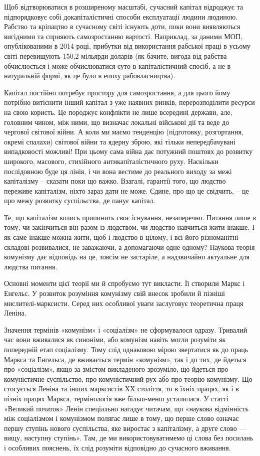 \documentclass[12pt,a4paper,openany]{book}
\begin{document}
Щоб відтворюватися в розширеному масштабі, сучасний капітал відроджує та підпорядковує собі докапіталістичні способи експлуатації людини людиною. Рабство та кріпацтво в сучасному світі існують доти, поки вони виявляються вигідними та сприяють самозростанню вартості. Наприклад, за даними МОП, опублікованими в 2014 році, прибутки від використання рабської праці в усьому світі перевищують 150,2 мільярди доларів (як бачите, вигода від рабства обчислюється і може обчислюватися суто в капіталістичний спосіб, а не в натуральній формі, як це було в епоху рабовласництва).

Капітал постійно потребує простору для самозростання, а для цього йому потрібно витіснити інший капітал з уже наявних ринків, перерозподілити ресурси на свою користь. Це породжує конфлікти не лише всередині держави, але, головним чином, між ними, що визначає локальні військові дії та веде до чергової світової війни. А коли ми маємо тенденцію (підготовку, розгортання, окремі спалахи) світової війни та ядерну зброю, які тільки непередбачувані випадковості можливі! При цьому сама війна дає потужний поштовх до розвитку широкого, масового, стихійного антикапіталістичного руху. Наскільки послідовною буде ця лінія, і чи вона вестиме до реального виходу за межі капіталізму – сказати поки що важко. Взагалі, гарантії того, що людство переживе капіталізм, ніхто зараз дати не може. Єдине, про що це свідчить, – це про межу розвитку суспільства, де панує капітал.

Те, що капіталізм колись припинить своє існування, незаперечно. Питання лише в тому, чи закінчиться він разом із людством, чи людство навчиться жити інакше. І як саме інакше можна жити, щоб і людство в цілому, і всі його різноманітні складові розвивалися, не заважаючи, а допомагаючи одне одному? Наукова теорія комунізму дає відповідь на це, зовсім не застаріле, а надзвичайно актуальне для людства питання.

Основні моменти цієї теорії ми й спробуємо тут викласти. Її створили Маркс і Енгельс. У розвиток розуміння комунізму свій внесок зробили й пізніші мислителі-марксисти. Серед них особливої уваги заслуговує теоретична праця Леніна.

Значення термінів «комунізм» і «соціалізм» не сформувалося одразу. Тривалий час вони вживалися як синоніми, або комунізм навіть могли розуміти як попередній етап соціалізму. Тому слід однаковою мірою звертатися як до праць Маркса та Енгельса, де вживається термін «комунізм», так і до тих, де йдеться про «соціалізм», якщо за змістом викладеного зрозуміло, що йдеться про комуністичне суспільство, про комуністичний рух або про теорію комунізму. Що стосується Леніна та інших марксистів ХХ століття, то в їхніх працях, як і в пізніх працях Маркса, термінологія вже більш-менш усталилася. У статті «Великий початок» Ленін спеціально нагадує читачам, що «наукова відмінність між соціалізмом і комунізмом полягає лише в тому, що перше слово означає першу ступінь нового суспільства, яке виростає з капіталізму, а друге слово — вищу, наступну ступінь». Там, де ми використовуватимемо ці слова без посилань і особливих пояснень, їх слід розуміти відповідно до сучасного вживання.
\end{document}
